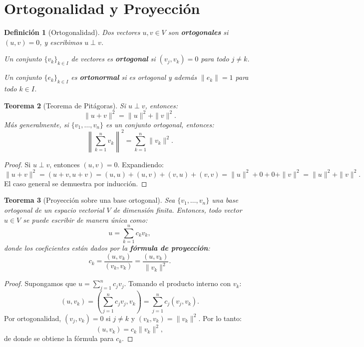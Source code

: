 \documentclass[a4paper,11pt]{report}
\newtheorem{theorem}{Teorema}[chapter]
\newtheorem{definition}[theorem]{Definición}
\begin{document}
\section{Ortogonalidad y Proyección}

\begin{definition}[Ortogonalidad]
Dos vectores $u, v \in V$ son \textbf{ortogonales} si $(u,v) = 0$, y escribimos $u \perp v$.

Un conjunto $\{v_k\}_{k \in I}$ de vectores es \textbf{ortogonal} si $(v_j, v_k) = 0$ para todo $j \neq k$.

Un conjunto $\{e_k\}_{k \in I}$ es \textbf{ortonormal} si es ortogonal y además $\|e_k\| = 1$ para todo $k \in I$.
\end{definition}

\begin{theorem}[Teorema de Pitágoras]
\label{thm:pitagoras_appendix}
Si $u \perp v$, entonces:
\[
\|u + v\|^2 = \|u\|^2 + \|v\|^2.
\]
Más generalmente, si $\{v_1, \ldots, v_n\}$ es un conjunto ortogonal, entonces:
\[
\left\| \sum_{k=1}^n v_k \right\|^2 = \sum_{k=1}^n \|v_k\|^2.
\]
\end{theorem}

\begin{proof}
Si $u \perp v$, entonces $(u,v) = 0$. Expandiendo:
\[
\|u+v\|^2 = (u+v, u+v) = (u,u) + (u,v) + (v,u) + (v,v) = \|u\|^2 + 0 + 0 + \|v\|^2 = \|u\|^2 + \|v\|^2.
\]
El caso general se demuestra por inducción.
\end{proof}

\begin{theorem}[Proyección sobre una base ortogonal]
Sea $\{v_1, \ldots, v_n\}$ una base ortogonal de un espacio vectorial $V$ de dimensión finita. Entonces, todo vector $u \in V$ se puede escribir de manera única como:
\[
u = \sum_{k=1}^n c_k v_k,
\]
donde los coeficientes están dados por la \textbf{fórmula de proyección}:
\begin{equation}\label{proyeccion_ortogonal_appendix}
c_k = \frac{(u, v_k)}{(v_k, v_k)} = \frac{(u, v_k)}{\|v_k\|^2}.
\end{equation}
\end{theorem}

\begin{proof}
Supongamos que $u = \sum_{j=1}^n c_j v_j$. Tomando el producto interno con $v_k$:
\[
(u, v_k) = \left( \sum_{j=1}^n c_j v_j, v_k \right) = \sum_{j=1}^n c_j (v_j, v_k).
\]
Por ortogonalidad, $(v_j, v_k) = 0$ si $j \neq k$ y $(v_k, v_k) = \|v_k\|^2$. Por lo tanto:
\[
(u, v_k) = c_k \|v_k\|^2,
\]
de donde se obtiene la fórmula para $c_k$.
\end{proof}
\end{document}
